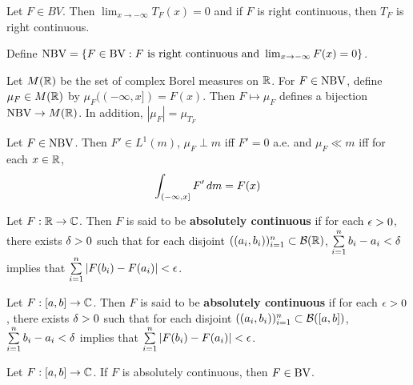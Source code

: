 \documentclass{book}
\begin{document}
	\begin{lem}
		Let $F \in BV$. Then $\lim_{x \rightarrow -\infty}T_F(x)=0$ and if $F$ is right continuous, then $T_F$ is right continuous.
	\end{lem}
	
	\begin{defn}  
		Define $\text{NBV}=\{F \in \text{BV}: F \text{ is right continuous and }\lim_{x \rightarrow -\infty}F(x)=0\}$.
	\end{defn}
	
	\begin{thm}
		Let $M(\mathbb{R})$ be the set of complex Borel measures on $\mathbb{R}$. For $F \in \text{NBV}$, define $\mu_F \in M(\mathbb{R})$ by $\mu_F((-\infty, x]) = F(x)$. Then $F \mapsto \mu_F$ defines a bijection $\text{NBV} \rightarrow M(\mathbb{R})$. In addition, $|\mu_F| = \mu_{T_F}$
	\end{thm}
	
	\begin{thm}
		Let $F \in \text{NBV}$. Then $F' \in L^1(m)$, $\mu_F \perp m$ iff $F' =0$ a.e. and $\mu_F \ll m$ iff for each $x \in \mathbb{R}$, $$\int_{(-\infty, x]}F'\, d m = F(x)$$
	\end{thm}
	
	\begin{defn}  
		Let $F: \mathbb{R} \rightarrow \mathbb{C}$. Then $F$ is said to be \textbf{absolutely continuous} if for each $\epsilon>0$, there exists $\delta>0$ such that for each disjoint $((a_i, b_i))_{i=1}^n \subset \mathcal{B}(\mathbb{R})$, $\sum\limits_{i=1}^n b_i-a_i < \delta$ implies that $\sum\limits_{i=1}^n|F(b_i)-F(a_i)| < \epsilon$.
	\end{defn}
	
	\begin{defn}  
		Let $F: [a,b] \rightarrow \mathbb{C}$. Then $F$ is said to be \textbf{absolutely continuous} if for each $\epsilon>0$, there exists $\delta>0$ such that for each disjoint $((a_i, b_i))_{i=1}^n \subset \mathcal{B}([a,b])$, $\sum\limits_{i=1}^n b_i-a_i < \delta$ implies that $\sum\limits_{i=1}^n|F(b_i)-F(a_i)| < \epsilon$.
	\end{defn}
	
	\begin{ex}  
		Let $F:[a,b] \rightarrow \mathbb{C}$. If $F$ is absolutely continuous, then $F \in \text{BV}$.
	\end{ex}
	
\end{document}
